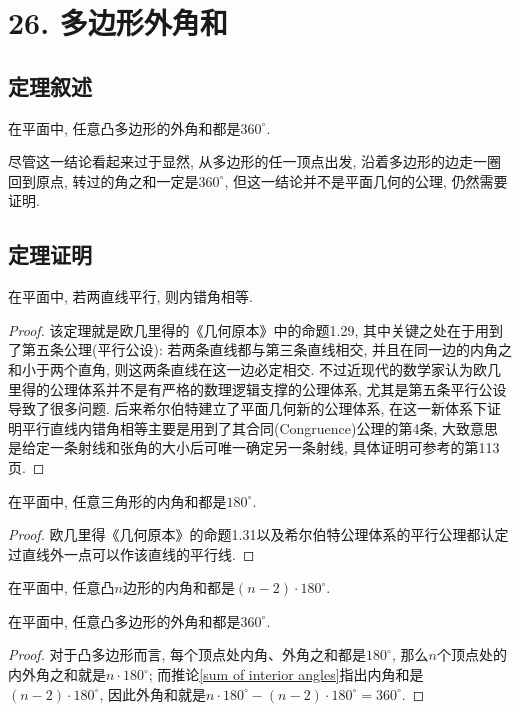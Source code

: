 \documentclass[main]{subfiles}
\begin{document}
	\renewcommand{\filename}{26. 多边形外角和}%
\section{26. 多边形外角和}
\subsection{定理叙述}
	在平面中, 任意凸多边形的外角和都是$360^{\circ}$.
	
	尽管这一结论看起来过于显然, 从多边形的任一顶点出发, 沿着多边形的边走一圈回到原点, 转过的角之和一定是$360^{\circ}$, 但这一结论并不是平面几何的公理, 仍然需要证明.
\subsection{定理证明}
	\begin{theorem}\label{key}
		在平面中, 若两直线平行, 则内错角相等.
	\end{theorem}
	\begin{proof}
		该定理就是欧几里得的《几何原本》\cite{Euclid}中的命题1.29, 其中关键之处在于用到了{\kaishu 第五条公理(平行公设)}: 若两条直线都与第三条直线相交, 并且在同一边的内角之和小于两个直角, 则这两条直线在这一边必定相交. 不过近现代的数学家认为欧几里得的公理体系并不是有严格的数理逻辑支撑的公理体系, 尤其是第五条平行公设导致了很多问题. 后来希尔伯特建立了平面几何新的公理体系\cite{Hilbert}, 在这一新体系下证明平行直线内错角相等主要是用到了其{\kaishu 合同(Congruence)公理的第4条}, 大致意思是给定一条射线和张角的大小后可唯一确定另一条射线, 具体证明可参考\cite{Hartshorne}的第113页.
	\end{proof}
	
	\begin{theorem}
		在平面中, 任意三角形的内角和都是$180^{\circ}$.
	\end{theorem}
	\begin{proof}
		欧几里得《几何原本》\cite{Euclid}的命题1.31以及希尔伯特公理体系\cite{Hilbert}的平行公理都认定过直线外一点可以作该直线的平行线.
	\end{proof}
	
	\begin{corollary}\label{sum of interior angles}
		在平面中, 任意凸$n$边形的内角和都是$(n-2)\cdot 180^{\circ}$.
	\end{corollary}
	
	\begin{corollary}\label{sum of exterior angles}
		在平面中, 任意凸多边形的外角和都是$360^{\circ}$.
	\end{corollary}
	\begin{proof}
		对于凸多边形而言, 每个顶点处内角、外角之和都是$180^{\circ}$, 那么$n$个顶点处的内外角之和就是$n\cdot 180^{\circ}$; 而推论\ref{sum of interior angles}指出内角和是$(n-2)\cdot 180^{\circ}$, 因此外角和就是$n\cdot 180^{\circ}-(n-2)\cdot 180^{\circ}=360^{\circ}$.
	\end{proof}
	
\end{document}
